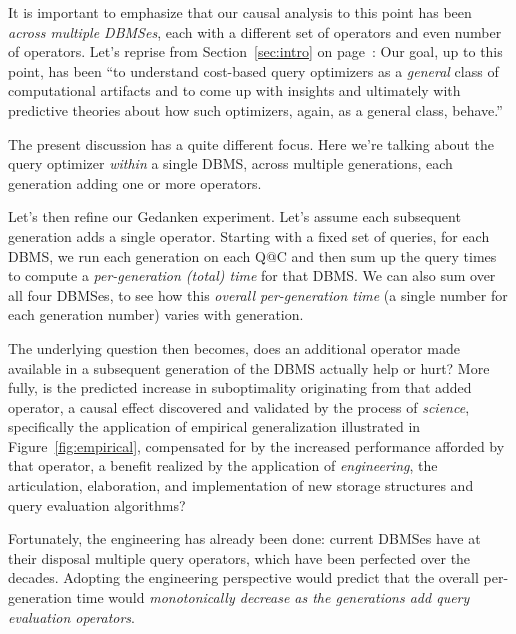 \documentclass[prodmode,acmtods]{acmsmall}
\begin{document}
It is important to emphasize that our causal analysis to this point has been
{\em across multiple \hbox{DBMSes}}, each with a different set of
operators and even number of operators. Let's reprise from Section~\ref{sec:intro} on
page~\pageref{sec:intro}: Our goal, up to this point, has been ``to \hbox{understand} cost-based query
optimizers
as a {\em general} class of computational artifacts and to come up with
insights and ultimately with predictive theories about how such optimizers,
again, as a general class, behave.''

The present discussion has a quite different focus. Here we're talking about
the query optimizer {\em within} a single \hbox{DBMS}, across multiple
generations, each generation adding one or more operators.

Let's then refine our Gedanken experiment. Let's assume each subsequent
generation adds a single operator. Starting with a fixed set of queries,
for each DBMS, we run each generation on each Q@C and then sum up the query
times to compute a {\em per-generation (total) time} for that DBMS. We can
also sum over all four DBMSes, to see how this  {\em overall per-generation
  time} (a single number for each generation number) varies with generation.

The underlying question then becomes, does an additional operator made
available in a subsequent generation of the \hbox{DBMS} actually help or
hurt? More fully, is the predicted increase in suboptimality originating
from that added operator, a causal effect discovered and validated by the process
of {\em science}, specifically the application of \hbox{empirical} generalization illustrated
in Figure~\ref{fig:empirical}, compensated for by the increased performance
afforded by that operator, a benefit realized by the application of {\em
  engineering}, the articulation, elaboration, and implementation of new
storage structures and query evaluation algorithms?

Fortunately, the engineering has already been done: current DBMSes have at
their disposal multiple query operators, which have been perfected over the
decades. Adopting the engineering perspective would predict that the overall per-generation
time would {\em monotonically decrease as the generations add query evaluation
operators}.
\end{document}
